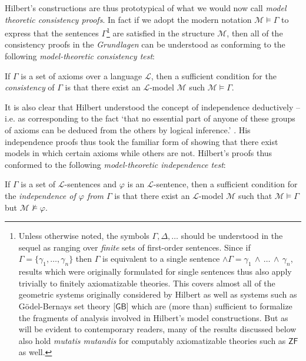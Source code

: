 \documentclass[11pt,fleqn,leqno]{article}
\def\phi{\varphi}
\def\mand{\, \wedge \, }
\begin{document}
Hilbert's constructions are thus prototypical of what we would now call \textsl{model theoretic consistency proofs}. In fact if we adopt the modern notation $\mathcal{M} \models \Gamma$ to express that the sentences $\Gamma$\footnote{Unless otherwise noted, the symbols $\Gamma, \Delta, \ldots$ should be understood in the sequel as ranging over \textsl{finite} sets of first-order sentences.   Since if $\Gamma = \{\gamma_1, \ldots, \gamma_n\}$ then $\Gamma$ is equivalent to a single sentence $\wedge \Gamma = \gamma_1 \mand \ldots \mand \gamma_n$, results which were originally formulated for single sentences thus also apply trivially to finitely axiomatizable theories.  This  covers almost all of the geometric systems originally considered by Hilbert as well as systems such as G\"odel-Bernays set theory [$\mathsf{GB}$] which are (more than) sufficient to formalize the fragments of analysis involved in Hilbert's model constructions.  But as will be evident to contemporary readers, many of the results discussed below also hold \textsl{mutatis mutandis} for computably axiomatizable theories such as $\mathsf{ZF}$ as well.}  are satisfied in the structure $\mathcal{M}$, then all of the consistency proofs in the \textsl{Grundlagen} can be understood as conforming to the following \textsl{model-theoretic consistency test}:
\begin{example}[(MCT)] 
If $\Gamma$ is a set of axioms over a language $\mathcal{L}$, then a sufficient condition for the \textsl{consistency} of $\Gamma$ is that there exist an $\mathcal{L}$-model $\mathcal{M}$ such $\mathcal{M} \models \Gamma$.   
\end{example} 

It is also clear that Hilbert understood the concept of independence deductively -- i.e. as corresponding to the fact `that no essential part of anyone of these groups of axioms can be deduced from the others by logical inference.' \citeyearpar[p. 32]{Hilbert1971}.   His independence proofs thus took the familiar form of showing that there exist models in which certain axioms while others are not.  Hilbert's proofs thus conformed to the following \textsl{model-theoretic independence test}:
\begin{example}[(MIT)]
If $\Gamma$ is a set of $\mathcal{L}$-sentences and $\phi$ is an $\mathcal{L}$-sentence, then a sufficient condition for the \textsl{independence of $\phi$ from $\Gamma$} is that there exist an $\mathcal{L}$-model $\mathcal{M}$ such that $\mathcal{M} \models \Gamma$ but $\mathcal{M} \not\models \phi$.
\end{example} 
\end{document}
